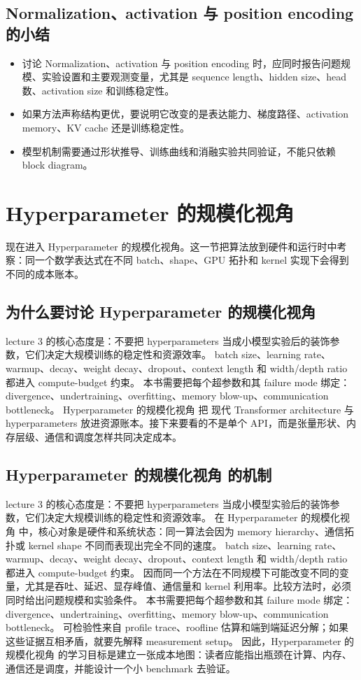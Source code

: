 \documentclass[a4paper]{article}
\begin{document}
\subsection{Normalization、activation 与 position encoding 的小结}
\begin{itemize}
\item 讨论 Normalization、activation 与 position encoding 时，应同时报告问题规模、实验设置和主要观测变量，尤其是 sequence length、hidden size、head 数、activation size 和训练稳定性。
\item 如果方法声称结构更优，要说明它改变的是表达能力、梯度路径、activation memory、KV cache 还是训练稳定性。
\item 模型机制需要通过形状推导、训练曲线和消融实验共同验证，不能只依赖 block diagram。
\end{itemize}
\section{Hyperparameter 的规模化视角}
现在进入 Hyperparameter 的规模化视角。这一节把算法放到硬件和运行时中考察：同一个数学表达式在不同 batch、shape、GPU 拓扑和 kernel 实现下会得到不同的成本账本。
\subsection{为什么要讨论 Hyperparameter 的规模化视角}
lecture 3 的核心态度是：不要把 hyperparameters 当成小模型实验后的装饰参数，它们决定大规模训练的稳定性和资源效率。
batch size、learning rate、warmup、decay、weight decay、dropout、context length 和 width/depth ratio 都进入 compute-budget 约束。
本书需要把每个超参数和其 failure mode 绑定：divergence、undertraining、overfitting、memory blow-up、communication bottleneck。
Hyperparameter 的规模化视角 把 现代 Transformer architecture 与 hyperparameters 放进资源账本。接下来要看的不是单个 API，而是张量形状、内存层级、通信和调度怎样共同决定成本。
\subsection{Hyperparameter 的规模化视角 的机制}
lecture 3 的核心态度是：不要把 hyperparameters 当成小模型实验后的装饰参数，它们决定大规模训练的稳定性和资源效率。 在 Hyperparameter 的规模化视角 中，核心对象是硬件和系统状态：同一算法会因为 memory hierarchy、通信拓扑或 kernel shape 不同而表现出完全不同的速度。
batch size、learning rate、warmup、decay、weight decay、dropout、context length 和 width/depth ratio 都进入 compute-budget 约束。 因而同一个方法在不同规模下可能改变不同的变量，尤其是吞吐、延迟、显存峰值、通信量和 kernel 利用率。比较方法时，必须同时给出问题规模和实验条件。
本书需要把每个超参数和其 failure mode 绑定：divergence、undertraining、overfitting、memory blow-up、communication bottleneck。 可检验性来自 profile trace、roofline 估算和端到端延迟分解；如果这些证据互相矛盾，就要先解释 measurement setup。
因此，Hyperparameter 的规模化视角 的学习目标是建立一张成本地图：读者应能指出瓶颈在计算、内存、通信还是调度，并能设计一个小 benchmark 去验证。
\end{document}
